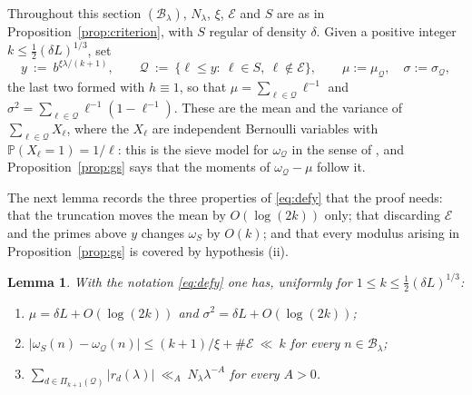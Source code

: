 \documentclass[11pt,a4paper]{article}
\theoremstyle{plain}
\newtheorem{lemma}[theorem]{Lemma}
\theoremstyle{definition}
\numberwithin{equation}{section}
\begin{document}
Throughout this section $(\mathcal B_\lambda)$, $N_\lambda$, $\xi$, $\mathcal E$ and $S$ are as
in Proposition~\ref{prop:criterion}, with $S$ regular of density $\delta$. Given a positive integer
$k\le\frac12(\delta L)^{1/3}$, set
\begin{equation}\label{eq:defy}
y\ :=\ b^{\xi\lambda/(k+1)},\qquad
\mathcal Q\ :=\ \{\ell\le y:\ \ell\in S,\ \ell\notin\mathcal E\},\qquad
\mu:=\mu_{\mathcal Q},\quad \sigma:=\sigma_{\mathcal Q},
\end{equation}
the last two formed with $h\equiv1$, so that $\mu=\sum_{\ell\in\mathcal Q}\ell^{-1}$ and
$\sigma^{2}=\sum_{\ell\in\mathcal Q}\ell^{-1}(1-\ell^{-1})$. These are the mean and the variance of
$\sum_{\ell\in\mathcal Q}X_\ell$, where the $X_\ell$ are independent Bernoulli variables with
$\mathbb P(X_\ell=1)=1/\ell$: this is the sieve model for $\omega_{\mathcal Q}$ in the sense of
\cite{GS}, and Proposition~\ref{prop:gs} says that the moments of $\omega_{\mathcal Q}-\mu$ follow it.

The next lemma records the three properties of \eqref{eq:defy} that the proof needs: that the
truncation moves the mean by $O(\log(2k))$ only; that discarding $\mathcal E$ and the primes above $y$
changes $\omega_S$ by $O(k)$; and that every modulus arising in Proposition~\ref{prop:gs} is covered by
hypothesis (ii).

\begin{lemma}\label{lem:setup}
With the notation \eqref{eq:defy} one has, uniformly for $1\le k\le\frac12(\delta L)^{1/3}$:
\begin{enumerate}
\item[\textup{(i)}] $\mu=\delta L+O(\log(2k))$ and $\sigma^{2}=\delta L+O(\log(2k))$;
\item[\textup{(ii)}] $\bigl|\omega_S(n)-\omega_{\mathcal Q}(n)\bigr|\le (k+1)/\xi+\#\mathcal E\ \ll\ k$ for every
$n\in\mathcal B_\lambda$;
\item[\textup{(iii)}] $\displaystyle\sum_{d\in \Pi_{k+1}(\mathcal Q)}|r_d(\lambda)|\ \ll_A\ N_\lambda\lambda^{-A}$
for every $A>0$.
\end{enumerate}
\end{lemma}
\end{document}
